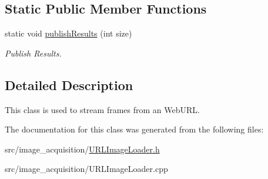 \subsection*{Static Public Member Functions}
\begin{DoxyCompactItemize}
\item 
\mbox{\label{classimage__acquisition_1_1_u_r_l_image_loader_adc7b74702eacfac70c928e7f9e68a7cd}} 
static void \mbox{\hyperlink{classimage__acquisition_1_1_u_r_l_image_loader_adc7b74702eacfac70c928e7f9e68a7cd}{publish\+Results}} (int size)
\begin{DoxyCompactList}\small\item\em Publish Results. \end{DoxyCompactList}\end{DoxyCompactItemize}


\subsection{Detailed Description}
This class is used to stream frames from an Web\+U\+RL. 

The documentation for this class was generated from the following files\+:\begin{DoxyCompactItemize}
\item 
src/image\+\_\+acquisition/\mbox{\hyperlink{_u_r_l_image_loader_8h}{U\+R\+L\+Image\+Loader.\+h}}\item 
src/image\+\_\+acquisition/U\+R\+L\+Image\+Loader.\+cpp\end{DoxyCompactItemize}
